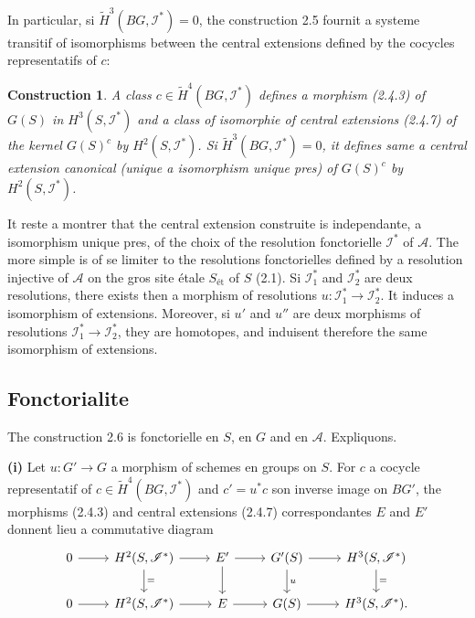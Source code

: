 \documentclass[11pt,a4paper]{article}
\theoremstyle{plain}
\newtheorem{construction}[theorem]{Construction}
\theoremstyle{definition}
\newcommand{\et}{\text{\'et}}
\begin{document}
In particular, si $\widetilde{H}^3(BG, \mathscr{I}^*) = 0$, the construction 2.5 fournit a systeme transitif of isomorphisms between the central extensions defined by the cocycles representatifs of $c$:

\begin{construction}\label{2.6}
A class $c \in \widetilde{H}^4(BG, \mathscr{I}^*)$ defines a morphism (2.4.3) of $G(S)$ in $H^3(S, \mathscr{I}^*)$ and a class of isomorphie of central extensions (2.4.7) of the kernel $G(S)^c$ by $H^2(S, \mathscr{I}^*)$. Si $\widetilde{H}^3(BG, \mathscr{I}^*) = 0$, it defines same a central extension canonical (unique a isomorphism unique pres) of $G(S)^c$ by $H^2(S, \mathscr{I}^*)$.
\end{construction}

It reste a montrer that the central extension construite is independante, a isomorphism unique pres, of the choix of the resolution fonctorielle $\mathscr{I}^*$ of $\mathscr{A}$. The more simple is of se limiter to the resolutions fonctorielles defined by a resolution injective of $\mathscr{A}$ on the gros site étale $S_{\et}$ of $S$ (2.1). Si $\mathscr{I}_1^*$ and $\mathscr{I}_2^*$ are deux resolutions, there exists then a morphism of resolutions $u : \mathscr{I}_1^* \to \mathscr{I}_2^*$. It induces a isomorphism of extensions. Moreover, si $u'$ and $u''$ are deux morphisms of resolutions $\mathscr{I}_1^* \to \mathscr{I}_2^*$, they are homotopes, and induisent therefore the same isomorphism of extensions.

\subsection{Fonctorialite}\label{2.7}

The construction 2.6 is fonctorielle en $S$, en $G$ and en $\mathscr{A}$. Expliquons.

\textbf{(i)} Let $u : G' \to G$ a morphism of schemes en groups on $S$. For $c$ a cocycle representatif of $c \in \widetilde{H}^4(BG, \mathscr{I}^*)$ and $c' = u^* c$ son inverse image on $BG'$, the morphisms (2.4.3) and central extensions (2.4.7) correspondantes $E$ and $E'$ donnent lieu a commutative diagram
\begin{equation}\label{2.7.1}
\begin{tikzcd}
0 \arrow{r} & H^2(S, \mathscr{I}^*) \arrow{r} \arrow{d}{=} & E' \arrow{r} \arrow{d} & G'(S) \arrow{r} \arrow{d}{u} & H^3(S, \mathscr{I}^*) \arrow{d}{=} \\
0 \arrow{r} & H^2(S, \mathscr{I}^*) \arrow{r} & E \arrow{r} & G(S) \arrow{r} & H^3(S, \mathscr{I}^*).
\end{tikzcd}
\end{equation}
\end{document}

